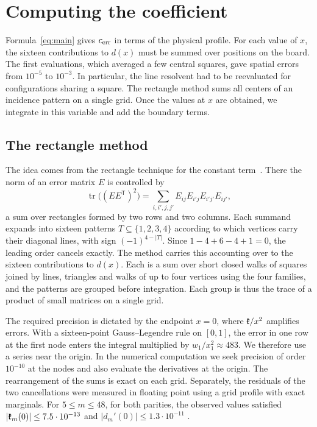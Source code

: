 \section{Computing the coefficient}\label{sec:numeval}
Formula~\eqref{eq:main} gives $c_{\mathrm{err}}$ in terms of the physical profile. For each value of $x$, the
sixteen contributions to $d(x)$ must be summed over positions on the board. The first evaluations, which
averaged a few central squares, gave spatial errors from $10^{-5}$ to $10^{-3}$. In particular, the line
resolvent had to be reevaluated for configurations sharing a square. The rectangle method sums all
centers of an incidence pattern on a single grid. Once the values at $x$ are obtained, we integrate in
this variable and add the boundary terms.

\subsection{The rectangle method}\label{sec:rectangulos}
The idea comes from the rectangle technique for the constant term~\cite[\S4]{tc}. There the norm of an
error matrix $E$ is controlled by
\[
 \operatorname{tr}\bigl((EE^{\mathsf T})^2\bigr)=\sum_{i,i',j,j'}E_{ij}E_{i'j}E_{i'j'}E_{ij'},
\]
a sum over rectangles formed by two rows and two columns. Each summand expands into sixteen patterns
$T\subseteq\{1,2,3,4\}$ according to which vertices carry their diagonal lines, with sign $(-1)^{4-|T|}$.
Since $1-4+6-4+1=0$, the leading order cancels exactly. The method carries this accounting over to the
sixteen contributions to $d(x)$. Each is a sum over short closed walks of squares joined by lines,
triangles and walks of up to four vertices using the four families, and the patterns are grouped before
integration. Each group is thus the trace of a product of small matrices on a single grid.

The required precision is dictated by the endpoint $x=0$, where $\mathfrak{k}/x^2$ amplifies errors. With a
sixteen-point Gauss--Legendre rule on $[0,1]$, the error in one row at the first node enters the integral
multiplied by $w_1/x_1^2\approx483$. We therefore use a series near the origin. In the numerical
computation we seek precision of order $10^{-10}$ at the nodes and also evaluate the derivatives at the
origin. The rearrangement of the sums is exact on each grid. Separately, the residuals of the two
cancellations were measured in floating point using a grid profile with exact marginals. For $5\le
m\le48$, for both parities, the observed values satisfied $|\mathfrak{k}_m(0)|\le7.5\cdot10^{-13}$ and
$|d_m'(0)|\le1.3\cdot10^{-11}$ .

